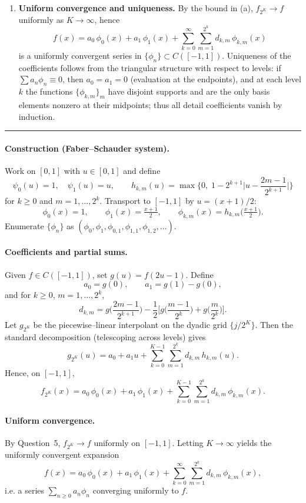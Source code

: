 \documentclass[12pt,a4paper]{article}
\theoremstyle{plain}
\theoremstyle{definition}
\theoremstyle{remark}
\theoremstyle{remark}
\begin{document}
\begin{enumerate}[label=(\alph*), leftmargin=*, itemsep=0.5em]
	\item \textbf{Uniform convergence and uniqueness.}
	By the bound in (a), $f_{2^{K}}\to f$ uniformly as $K\to\infty$, hence
	\[
	f(x)= a_0\,\phi_0(x)+a_1\,\phi_1(x)
	+ \sum_{k=0}^{\infty}\sum_{m=1}^{2^{k}} d_{k,m}\,\phi_{k,m}(x)
	\]
	is a uniformly convergent series in $\{\phi_n\}\subset C([-1,1])$.
	Uniqueness of the coefficients follows from the triangular structure with respect to
	levels: if $\sum a_n\phi_n\equiv 0$, then $a_0=a_1=0$ (evaluation at the endpoints),
	and at each level $k$ the functions $\{\phi_{k,m}\}_m$ have disjoint supports and are
	the only basis elements nonzero at their midpoints; thus all detail coefficients vanish
	by induction.
\end{enumerate}

\noindent\rule{\textwidth}{0.4pt}


\paragraph{Construction (Faber–Schauder system).}
Work on $[0,1]$ with $u\in[0,1]$ and define
\[
\psi_0(u)=1,\quad \psi_1(u)=u,\qquad
h_{k,m}(u)=\max\!\Big\{0,\;1-2^{k+1}\Big|u-\frac{2m-1}{2^{k+1}}\Big|\Big\}
\]
for $k\ge0$ and $m=1,\dots,2^k$.
Transport to $[-1,1]$ by $u=(x+1)/2$:
\[
\phi_0(x)=1,\qquad \phi_1(x)=\tfrac{x+1}{2},\qquad
\phi_{k,m}(x)=h_{k,m}\!\Big(\tfrac{x+1}{2}\Big).
\]
Enumerate $\{\phi_n\}$ as $(\phi_0,\phi_1,\phi_{0,1},\phi_{1,1},\phi_{1,2},\ldots)$.

\paragraph{Coefficients and partial sums.}
Given $f\in C([-1,1])$, set $g(u)=f(2u-1)$. Define
\[
a_0=g(0),\qquad a_1=g(1)-g(0),
\]
and for $k\ge0$, $m=1,\dots,2^k$,
\[
d_{k,m}=g\!\Big(\frac{2m-1}{2^{k+1}}\Big)
-\frac12\Bigg[g\!\Big(\frac{m-1}{2^k}\Big)+g\!\Big(\frac{m}{2^k}\Big)\Bigg].
\]
Let $g_{2^K}$ be the piecewise–linear interpolant on the dyadic grid $\{j/2^K\}$.
Then the standard decomposition (telescoping across levels) gives
\[
g_{2^K}(u)=a_0+a_1 u+\sum_{k=0}^{K-1}\sum_{m=1}^{2^k} d_{k,m}\,h_{k,m}(u).
\]
Hence, on $[-1,1]$,
\[
f_{2^K}(x)=a_0\,\phi_0(x)+a_1\,\phi_1(x)
+\sum_{k=0}^{K-1}\sum_{m=1}^{2^k} d_{k,m}\,\phi_{k,m}(x).
\]

\paragraph{Uniform convergence.}
By Question~5, $f_{2^K}\to f$ uniformly on $[-1,1]$. Letting $K\to\infty$ yields the uniformly
convergent expansion
\[
f(x)=a_0\,\phi_0(x)+a_1\,\phi_1(x)
+\sum_{k=0}^{\infty}\sum_{m=1}^{2^k} d_{k,m}\,\phi_{k,m}(x),
\]
i.e. a series $\sum_{n\ge0} a_n\phi_n$ converging uniformly to $f$.
\end{document}
